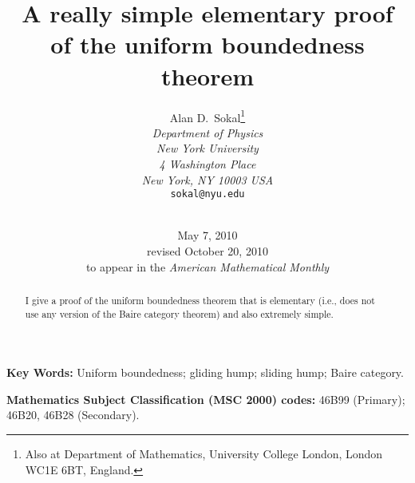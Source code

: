 \documentclass[12pt]{article}
\begin{document}
\title{A really simple elementary proof \\
       of the uniform boundedness theorem}

\author{
     {\small Alan D.~Sokal\thanks{Also at Department of Mathematics,
           University College London, London WC1E 6BT, England.}}  \\[-2mm]
     {\small\it Department of Physics}       \\[-2mm]
     {\small\it New York University}         \\[-2mm]
     {\small\it 4 Washington Place}          \\[-2mm]
     {\small\it New York, NY 10003 USA}      \\[-2mm]
     {\small\tt sokal@nyu.edu}               \\[-2mm]
     {\protect\makebox[5in]{\quad}}  %
     \\
}

\date{May 7, 2010 \\[3mm]
      revised October 20, 2010 \\[1mm]
      to appear in the {\em American Mathematical Monthly}}

\maketitle
\thispagestyle{empty}   %
\begin{abstract}
I give a proof of the uniform boundedness theorem that is elementary
(i.e., does not use any version of the Baire category theorem)
and also extremely simple.
\end{abstract}

\bigskip
\noindent
{\bf Key Words:}  Uniform boundedness;  gliding hump;  sliding hump;
Baire category.

\bigskip
\noindent
{\bf Mathematics Subject Classification (MSC 2000) codes:}
46B99 (Primary); 46B20, 46B28 (Secondary).

\clearpage




\newtheorem{theorem}{Theorem}[section]
\newtheorem{proposition}[theorem]{Proposition}
\newtheorem{lemma}[theorem]{Lemma}
\newtheorem{corollary}[theorem]{Corollary}
\newtheorem{definition}[theorem]{Definition}
\newtheorem{conjecture}[theorem]{Conjecture}
\newtheorem{question}[theorem]{Question}
\newtheorem{example}[theorem]{Example}
\newtheorem{remark}[theorem]{Remark}
\end{document}
